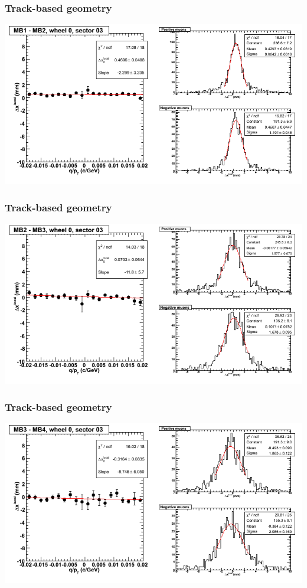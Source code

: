 \documentclass[compress]{beamer}
\begin{document}
\begin{frame}
\frametitle{Track-based geometry}
\includegraphics[width=\linewidth]{NOV4_segdiffs/dt13_resid_C_03_12.png}
\end{frame}

\begin{frame}
\frametitle{Track-based geometry}
\includegraphics[width=\linewidth]{NOV4_segdiffs/dt13_resid_C_03_23.png}
\end{frame}

\begin{frame}
\frametitle{Track-based geometry}
\includegraphics[width=\linewidth]{NOV4_segdiffs/dt13_resid_C_03_34.png}
\end{frame}
\end{document}
